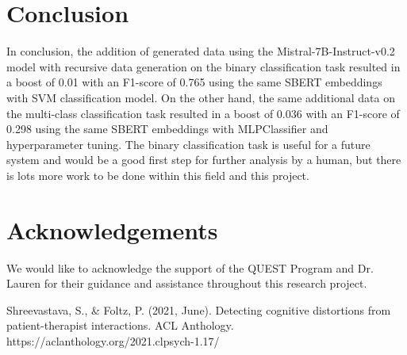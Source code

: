 \documentclass[a0,landscape]{a0poster}
\begin{document}
\begin{multicols}{4}
\color{Teal}
\section*{Conclusion}
\color{Black}

In conclusion, the addition of generated data using the Mistral-7B-Instruct-v0.2 model with recursive data generation on the binary classification task 
resulted in a boost of 0.01 with an F1-score of 0.765 using the same SBERT embeddings with SVM classification model. 
On the other hand, the same additional data on the multi-class classification task resulted in a boost of 0.036 with an F1-score of 0.298 
using the same SBERT embeddings with MLPClassifier and hyperparameter tuning.
The binary classification task is useful for a future system and would be a good first step for further analysis by a human, but there is lots more work to be done 
within this field and this project.

\color{Teal}
\section*{Acknowledgements}
\color{Black}

We would like to acknowledge the support of the QUEST Program and Dr. Lauren for their guidance and assistance throughout this research project.

\color{Teal}
\begin{thebibliography}{9}
\color{Black}

Shreevastava, S., \& Foltz, P. (2021, June). Detecting cognitive distortions from patient-therapist interactions. ACL Anthology. https://aclanthology.org/2021.clpsych-1.17/ 
\end{thebibliography}

\end{multicols}
\end{document}
